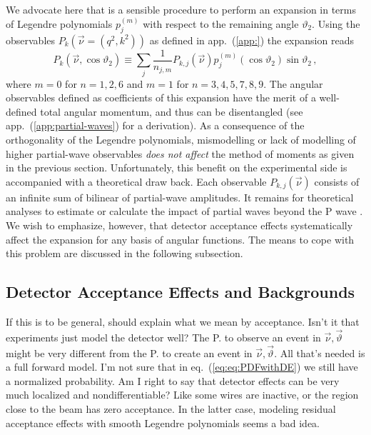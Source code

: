 \documentclass[aps,prd,reprint,nofootinbib,preprintnumbers]{revtex4}
\newcommand{\refapp}[1]{app.~(\ref{app:#1})}
\newcommand{\refeq}[1]{eq.~(\ref{eq:#1})}
\newcommand{\nuvec}{\vec{\nu}}
\newcommand{\thvec}{\vec{\vartheta}}
\renewcommand{\theta}{\vartheta}
\newcommand{\fred}[1]{{\color{brown!85!black}#1}}
\begin{document}
We advocate here that is a sensible procedure to perform an expansion in terms of Legendre polynomials $p_{j}^{(m)}$
with respect to the remaining angle $\theta_2$. Using the observables $P_k(\vec{\nu}=(q^2, k^2))$ as defined in \refapp{}
the expansion reads
\begin{equation}
    P_{k}(\vec{\nu},\cos\theta_2) \equiv \sum_{j} \frac{1}{n_{j,m}} P_{k,j}(\vec{\nu}) p_{j}^{(m)}(\cos\theta_2)\sin\theta_2\,,
\end{equation}
where $m=0$ for $n=1,2,6$ and $m=1$ for $n=3,4,5,7,8,9$. The angular observables defined as coefficients of this expansion
have the merit of a well-defined total angular momentum, and thus can be disentangled (see \refapp{partial-waves} for
a derivation). As a consequence of the orthogonality of the Legendre polynomials, mismodelling or lack of modelling of higher
partial-wave observables \emph{does not affect} the method of moments as given in the previous section.
Unfortunately, this benefit on the experimental side is accompanied with a theoretical draw back. Each observable
$P_{k,j}(\vec{\nu})$ consists of an infinite sum of bilinear of partial-wave amplitudes. It remains for theoretical
analyses to estimate or calculate the impact of partial waves beyond the P wave \cite{Das:2014}.\\

We wish to emphasize, however, that detector acceptance effects systematically affect the expansion for any basis
of angular functions. The means to cope with this problem are discussed in the following subsection.


\subsection{Detector Acceptance Effects and Backgrounds}
\label{sec:systematics:acceptance}

\fred{If this is to be general, should explain what we mean by
  acceptance. Isn't it that experiments just model the detector well?
  The P. to observe an event in $\nuvec, \thvec$ might be very
  different from the P. to create an event in $\nuvec, \thvec$. All
  that's needed is a full forward model. I'm not sure that in
  \refeq{eq:PDFwithDE} we still have a normalized probability. Am I
  right to say that detector effects can be very much localized and
  nondifferentiable? Like some wires are inactive, or the region close
  to the beam has zero acceptance. In the latter case, modeling
  residual acceptance effects with smooth Legendre polynomials seems a
  bad idea.}
\end{document}
